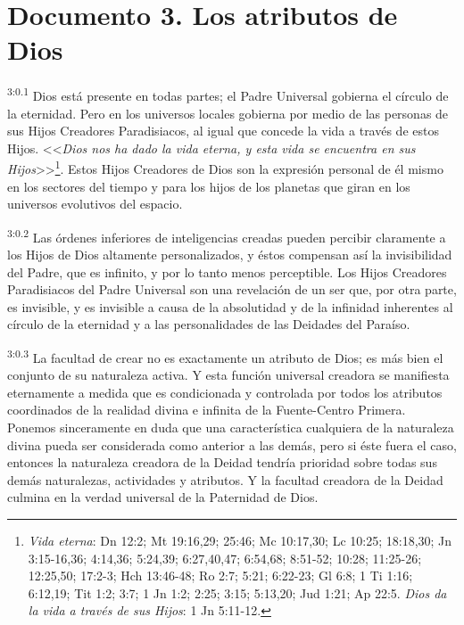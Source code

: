 \chapter{Documento 3. Los atributos de Dios}
\par
\textsuperscript{3:0.1} Dios está presente en todas partes; el Padre Universal gobierna el círculo de la eternidad. Pero en los universos locales gobierna por medio de las personas de sus Hijos Creadores Paradisiacos, al igual que concede la vida a través de estos Hijos. <<\textit{Dios nos ha dado la vida eterna, y esta vida se encuentra en sus Hijos}>>\footnote{\textit{Vida eterna}: Dn 12:2; Mt 19:16,29; 25:46; Mc 10:17,30; Lc 10:25; 18:18,30; Jn 3:15-16,36; 4:14,36; 5:24,39; 6:27,40,47; 6:54,68; 8:51-52; 10:28; 11:25-26; 12:25,50; 17:2-3; Hch 13:46-48; Ro 2:7; 5:21; 6:22-23; Gl 6:8; 1 Ti 1:16; 6:12,19; Tit 1:2; 3:7; 1 Jn 1:2; 2:25; 3:15; 5:13,20; Jud 1:21; Ap 22:5. \textit{Dios da la vida a través de sus Hijos}: 1 Jn 5:11-12.}. Estos Hijos Creadores de Dios son la expresión personal de él mismo en los sectores del tiempo y para los hijos de los planetas que giran en los universos evolutivos del espacio.

\par
\textsuperscript{3:0.2} Las órdenes inferiores de inteligencias creadas pueden percibir claramente a los Hijos de Dios altamente personalizados, y éstos compensan así la invisibilidad del Padre, que es infinito, y por lo tanto menos perceptible. Los Hijos Creadores Paradisiacos del Padre Universal son una revelación de un ser que, por otra parte, es invisible, y es invisible a causa de la absolutidad y de la infinidad inherentes al círculo de la eternidad y a las personalidades de las Deidades del Paraíso.

\par
\textsuperscript{3:0.3} La facultad de crear no es exactamente un atributo de Dios; es más bien el conjunto de su naturaleza activa. Y esta función universal creadora se manifiesta eternamente a medida que es condicionada y controlada por todos los atributos coordinados de la realidad divina e infinita de la Fuente-Centro Primera. Ponemos sinceramente en duda que una característica cualquiera de la naturaleza divina pueda ser considerada como anterior a las demás, pero si éste fuera el caso, entonces la naturaleza creadora de la Deidad tendría prioridad sobre todas sus demás naturalezas, actividades y atributos. Y la facultad creadora de la Deidad culmina en la verdad universal de la Paternidad de Dios.

